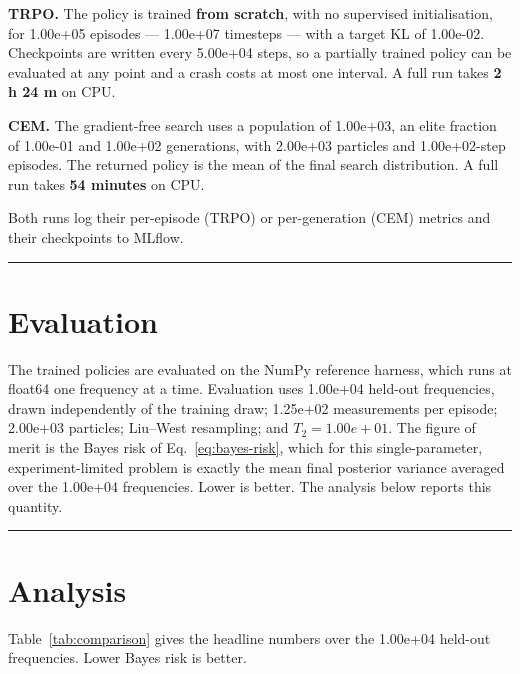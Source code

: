 \documentclass[12pt,a4paper]{article}
\begin{document}
\textbf{TRPO.} The policy is trained \textbf{from scratch}, with no
supervised initialisation, for 1.00e+05 episodes --- 1.00e+07 timesteps ---
with a target KL of 1.00e-02. Checkpoints are written every 5.00e+04 steps,
so a partially trained policy can be evaluated at any point and a crash costs
at most one interval. A full run takes \textbf{2 h 24 m} on CPU.

\textbf{CEM.} The gradient-free search uses a population of 1.00e+03, an
elite fraction of 1.00e-01 and 1.00e+02 generations, with 2.00e+03 particles
and 1.00e+02-step episodes. The returned policy is the mean of the final
search distribution. A full run takes \textbf{54 minutes} on CPU.

Both runs log their per-episode (TRPO) or per-generation (CEM) metrics and
their checkpoints to MLflow.

\noindent\rule{\textwidth}{0.4pt}
\FloatBarrier

\section{Evaluation}
\label{sec:evaluation}
The trained policies are evaluated on the NumPy reference harness, which
runs at float64 one frequency at a time. Evaluation uses 1.00e+04 held-out
frequencies, drawn independently of the training draw; 1.25e+02 measurements
per episode; 2.00e+03 particles; Liu--West resampling; and
$T_2 = 1.00e+01$. The figure of merit is the Bayes risk of
Eq.~\eqref{eq:bayes-risk}, which for this single-parameter,
experiment-limited problem is exactly the mean final posterior variance
averaged over the 1.00e+04 frequencies. Lower is better. The analysis below
reports this quantity.

\noindent\rule{\textwidth}{0.4pt}
\FloatBarrier

\section{Analysis}
\label{sec:analysis}
Table~\ref{tab:comparison} gives the headline numbers over the 1.00e+04
held-out frequencies. Lower Bayes risk is better.
\end{document}
